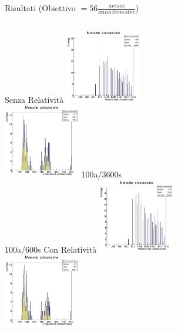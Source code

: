     \begin{frame}{Risultati (Obiettivo $= 56 \frac{arcsec}{anno\ terrestre}$)}
        \begin{columns}
                \centering
                Senza Relatività
                \includegraphics[width=\textwidth, height=3.25cm]{9_prec/sballati/100_3600_nor_1.jpg}\\
                \includegraphics[width=\textwidth, height=3.25cm]{9_prec/sballati/100_600_nor_1.jpg}
                \centering
                100a/3600s\\
                \vspace{3cm}
                100a/600s
                \centering
                Con Relatività
                \includegraphics[width=\textwidth, height=3.25cm]{9_prec/sballati/100_3600_rel_1.jpg}\\
                \includegraphics[width=\textwidth, height=3.25cm]{9_prec/sballati/100_600_rel_1.jpg}
        \end{columns}
    \end{frame}
